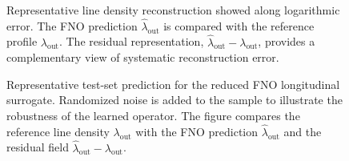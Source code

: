 \begin{figure}[h!]
\centering
{}
\caption{
Representative line density reconstruction showed along logarithmic error. The FNO prediction \(\widehat{\lambda}_{\mathrm{out}}\) is compared with the reference profile \(\lambda_{\mathrm{out}}\). The residual representation, \(\widehat{\lambda}_{\mathrm{out}}-\lambda_{\mathrm{out}}\), provides a complementary view of systematic reconstruction error.
}
\label{fig:fno_longitudinal_reconstruction}
\end{figure}

\begin{figure}[h!]
\centering
{}
\caption{
Representative test-set prediction for the reduced FNO longitudinal surrogate. Randomized noise is added to the sample to illustrate the robustness of the learned operator. The figure compares the reference line density \(\lambda_{\mathrm{out}}\) with the FNO prediction \(\widehat{\lambda}_{\mathrm{out}}\) and the residual field \(\widehat{\lambda}_{\mathrm{out}}-\lambda_{\mathrm{out}}\).
}
\label{fig:fno_profile_predictions_revised}
\end{figure}





